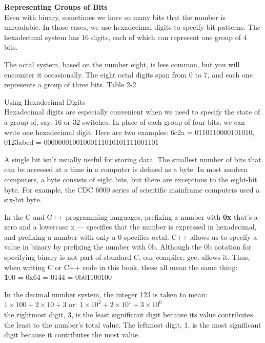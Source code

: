 \documentclass[12pt]{extarticle}
\begin{document}
\textbf{Representing Groups of Bits}\\
Even with binary, sometimes we have so many bits that the number is unreadable. In those cases,
we use hexadecimal digits to specify bit patterns. The hexadecimal system has 16 digits, each
of which can represent one group of 4 bits.

\vspace{18pt}
The octal system, based on the number eight, is less common, but you will encounter it occasionally.
The eight octal digits span from 0 to 7, and each one represents a group of three bits. Table 2-2

\vspace{18pt}
\large{Using Hexadecimal Digits}\\
Hexadecimal digits are especially convenient when we need to specify the state of a group of,
say, 16 or 32 switches. In place of each group of four bits, we can write one hexadecimal digit.
Here are two examples:
\center 6c2a = 0110110000101010, 0123abcd = 00000001001000111010101111001101

\vspace{18pt}
A single bit isn’t usually useful for storing data. The smallest number of bits that can be
accessed at a time in a computer is defined as a byte. In most modern computers, a byte
consists of eight bits, but there are exceptions to the eight-bit byte. For example, the
CDC 6000 series of scientific mainframe computers used a six-bit byte.

\vspace{18pt}
In the C and C++ programming languages, prefixing a number with \textbf{0x} that’s a zero and 
a lowercase x — specifies that the number is expressed in hexadecimal, and prefixing a number 
with only a 0 specifies octal. C++ allows us to specify a value in binary by prefixing the 
number with 0b. Although the 0b notation for specifying binary is not part of standard C,
our compiler, gcc, allows it. Thus, when writing C or C++ code in this book, these all mean
the same thing: \\
\Large\textbf 100 = 0x64 = 0144 = 0b01100100

\vspace{18pt}
In the decimal number system, the integer 123 is taken to mean: \\
$1 \times 100 + 2 \times 10 + 3 $  \hspace{4pt} or: $1 \times 10^2 + 2 \times 10^1 + 3 \times 10^0 $\\
the rightmost digit, 3, is the least significant digit because its value contributes the least
to the number’s total value. The leftmost digit, 1, is the most significant digit because it
contributes the most value.
\end{document}
